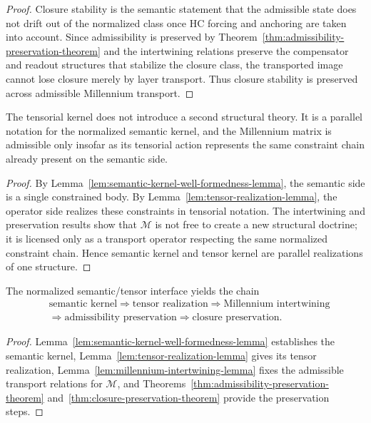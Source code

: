 \begin{proof}
Closure stability is the semantic statement that the admissible state does not
drift out of the normalized class once HC forcing and anchoring are taken into
account. Since admissibility is preserved by
Theorem~\ref{thm:admissibility-preservation-theorem} and the intertwining
relations preserve the compensator and readout structures that stabilize the
closure class, the transported image cannot lose closure merely by layer
transport. Thus closure stability is preserved across admissible Millennium
transport.
\end{proof}

\begin{proposition}
\label{prop:semantic-tensor-equivalence-proposition}
The tensorial kernel does not introduce a second structural theory. It is a
parallel notation for the normalized semantic kernel, and the Millennium matrix
is admissible only insofar as its tensorial action represents the same
constraint chain already present on the semantic side.
\end{proposition}

\begin{proof}
By Lemma~\ref{lem:semantic-kernel-well-formedness-lemma}, the semantic side is a
single constrained body. By Lemma~\ref{lem:tensor-realization-lemma}, the
operator side realizes these constraints in tensorial notation. The intertwining
and preservation results show that $\mathcal M$ is not free to create a new
structural doctrine; it is licensed only as a transport operator respecting the
same normalized constraint chain. Hence semantic kernel and tensor kernel are
parallel realizations of one structure.
\end{proof}

\begin{corollary}
\label{cor:first-semantic-tensor-forcing-chain}
The normalized semantic/tensor interface yields the chain
\[
\begin{aligned}
&\text{semantic kernel} \Longrightarrow \text{tensor realization} \Longrightarrow \text{Millennium intertwining}\\
&\Longrightarrow \text{admissibility preservation} \Longrightarrow \text{closure preservation}.
\end{aligned}
\]
\end{corollary}

\begin{proof}
Lemma~\ref{lem:semantic-kernel-well-formedness-lemma} establishes the semantic
kernel, Lemma~\ref{lem:tensor-realization-lemma} gives its tensor realization,
Lemma~\ref{lem:millennium-intertwining-lemma} fixes the admissible transport
relations for $\mathcal M$, and Theorems~\ref{thm:admissibility-preservation-theorem}
and~\ref{thm:closure-preservation-theorem} provide the preservation steps.
\end{proof}


